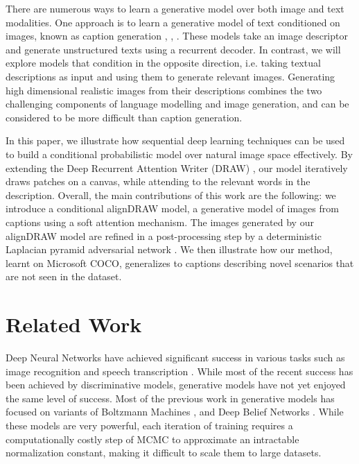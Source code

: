 \documentclass{article} %
\begin{document}
There are numerous ways to learn a generative model over both image and text modalities. One approach is to learn a generative model of text conditioned on images, known as caption generation
\citep{karpathy_captions}, \citep{xu_captions}, \citep{kiros_captions}. These models take an image descriptor and generate unstructured texts using a recurrent decoder. In contrast, we will explore models that condition in the opposite direction, i.e. taking textual descriptions as input and using them to generate relevant images.
Generating high dimensional realistic images from their descriptions 
combines the two challenging components of language modelling and image generation, and can be considered to be more difficult than caption generation. %

In this paper, we illustrate how sequential deep learning techniques can be used to build a conditional probabilistic model over natural image space effectively. By extending the Deep Recurrent Attention Writer (DRAW) \citep{gregor_draw}, our model iteratively draws patches on a canvas, while attending to the relevant words in the description. Overall, the main contributions of this work are the following: we introduce a conditional alignDRAW model, a generative model of images from captions using a soft attention mechanism. The images generated by our alignDRAW model are refined in a post-processing step by a deterministic Laplacian pyramid adversarial network \citep{denton_lapgan}. We then illustrate how our method, learnt on Microsoft COCO, generalizes to captions describing novel scenarios that are not seen in the dataset.

\section{Related Work}

Deep Neural Networks have achieved significant success in various tasks such as image recognition \citep{krizhevsky_imagenet} and speech transcription \citep{graves_speech}. 
While most of the recent success has been achieved by discriminative models, generative models have not yet enjoyed the same level of success. Most of the previous work in generative models has focused on variants of Boltzmann Machines \citep{smolensky_rbm}, \citep{russ_dbm} and Deep Belief Networks \citep{hinton_dbn}. While these models are very powerful, each iteration of training requires a computationally costly step of MCMC to approximate an intractable normalization constant, making it difficult to scale them to large datasets.
\end{document}
